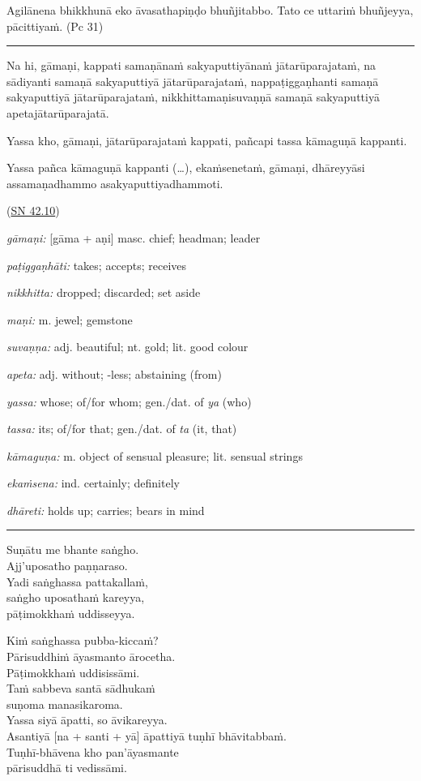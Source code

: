 \documentclass[11pt,oneside]{memoir}
\begin{document}
Agilānena bhikkhunā eko āvasathapiṇḍo bhuñjitabbo. Tato ce uttariṁ bhuñjeyya, pācittiyaṁ. (Pc 31)

\noindent\rule{\textwidth}{0.5pt}

\begin{widecols}
Na hi, gāmaṇi, kappati samaṇānaṁ sakyaputtiyānaṁ jātarūparajataṁ, na sādiyanti samaṇā sakyaputtiyā jātarūparajataṁ, nappaṭiggaṇhanti samaṇā sakyaputtiyā jātarūparajataṁ, nikkhittamaṇisuvaṇṇā samaṇā sakyaputtiyā apetajātarūparajatā.

Yassa kho, gāmaṇi, jātarūparajataṁ kappati, pañcapi tassa kāmaguṇā kappanti.

Yassa pañca kāmaguṇā kappanti (…), ekaṁsenetaṁ, gāmaṇi, dhāreyyāsi assamaṇadhammo asakyaputtiyadhammoti.

(\href{https://suttacentral.net/sn42.10/pli/ms}{SN 42.10})

\columnbreak

\emph{gāmaṇi:} [gāma + aṇi] masc. chief; headman; leader

\emph{paṭiggaṇhāti:} takes; accepts; receives

\emph{nikkhitta:} dropped; discarded; set aside

\emph{maṇi:} m. jewel; gemstone

\emph{suvaṇṇa:} adj. beautiful; nt. gold; lit. good colour

\emph{apeta:} adj. without; -less; abstaining (from)

\emph{yassa:} whose; of/for whom; gen./dat. of \emph{ya} (who)

\emph{tassa:} its; of/for that; gen./dat. of \emph{ta} (it, that)

\emph{kāmaguṇa:} m. object of sensual pleasure; lit. sensual strings

\emph{ekaṁsena:} ind. certainly; definitely

\emph{dhāreti:} holds up; carries; bears in mind
\end{widecols}

\noindent\rule{\textwidth}{0.5pt}

Suṇātu me bhante saṅgho. \\[0pt]
Ajj'uposatho paṇṇaraso. \\[0pt]
Yadi saṅghassa pattakallaṁ, \\[0pt]
saṅgho uposathaṁ kareyya, \\[0pt]
pāṭimokkhaṁ uddisseyya.

Kiṁ saṅghassa pubba-kiccaṁ? \\[0pt]
Pārisuddhiṁ āyasmanto ārocetha. \\[0pt]
Pāṭimokkhaṁ uddisissāmi. \\[0pt]
Taṁ sabbeva santā sādhukaṁ \\[0pt]
suṇoma manasikaroma. \\[0pt]
Yassa siyā āpatti, so āvikareyya. \\[0pt]
Asantiyā [na + santi + yā] āpattiyā tuṇhī bhāvitabbaṁ. \\[0pt]
Tuṇhī-bhāvena kho pan'āyasmante \\[0pt]
pārisuddhā ti vedissāmi.
\end{document}
